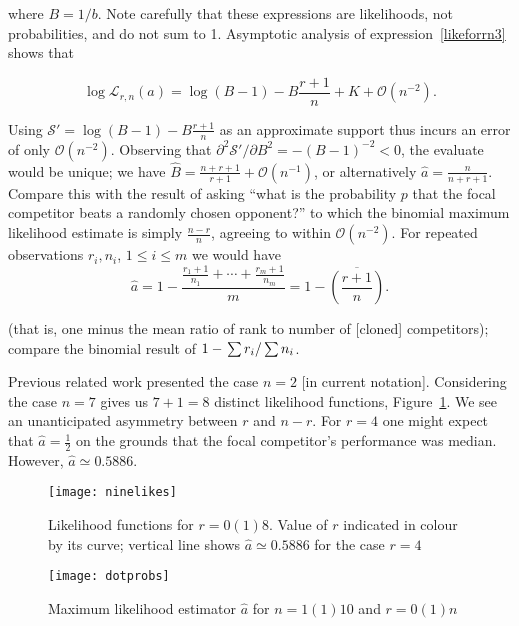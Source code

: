 \documentclass[ejs,noshowframe]{imsart}
\theoremstyle{plain}
\theoremstyle{definition}
\theoremstyle{remark}
\begin{document}
\noindent where $B=1/b$.  Note carefully that these expressions are
likelihoods, not probabilities, and do not sum to 1.  Asymptotic
analysis of expression~\ref{likeforrn3} shows that

\begin{equation}\label{asymptotic}
\log\mathcal{L}_{r,n}(a)=\log(B-1)-B\frac{r+1}{n}
+ K + \mathcal{O}\left(n^{-2}\right).
\end{equation}

Using $\mathcal{S}'=\log(B-1)-B\frac{r+1}{n}$ as an approximate support
thus incurs an error of only $\mathcal{O}(n^{-2})$.  Observing that
$\partial^2\mathcal{S'}/\partial B^2=-(B-1)^{-2}<0$, the evaluate
would be unique; we have
$\hat{B}=\frac{n+r+1}{r+1}+\mathcal{O}\left(n^{-1}\right)$, or
alternatively $\hat{a}=\frac{n}{n+r+1}$.  Compare this with the result
of asking ``what is the probability $p$ that the focal competitor
beats a randomly chosen opponent?'' to which the binomial maximum
likelihood estimate is simply $\frac{n-r}{n}$, agreeing to within
$\mathcal{O}(n^{-2})$.  For repeated observations $r_i,n_i$,
$1\leqslant i\leqslant m$ we would have
\begin{equation}
  \hat{a} = 1-
  \frac{\frac{r_1+1}{n_1}+\cdots+\frac{r_m+1}{n_m}}{m}
  = 1-\overline{\left(\frac{r+1}{n}\right)}.
\end{equation}

(that is, one minus the mean ratio of rank to number of [cloned]
competitors); compare the binomial result of $1-\left.\sum
r_i\right/\sum n_i$.

Previous related work presented the case $n=2$ [in current notation].
Considering the case $n=7$ gives us $7+1=8$ distinct likelihood
functions, Figure~\ref{ninelikes}.  We see an unanticipated asymmetry
between $r$ and $n-r$.  For $r=4$ one might expect that
$\hat{a}=\frac{1}{2}$ on the grounds that the focal competitor's
performance was median.  However, $\hat{a}\simeq 0.5886$.

\begin{figure}[t]
\texttt{[image: ninelikes]}  %
\caption{Likelihood functions for $r=0(1)8$\label{ninelikes}.  Value of $r$ indicated in colour by its curve; vertical line shows $\hat{a}\simeq 0.5886$ for the case $r=4$}
\end{figure}


\begin{figure}[t]
\texttt{[image: dotprobs]}  %
\caption{Maximum likelihood estimator $\hat{a}$ for $n=1(1)10$ and $r=0(1)n$
  \label{dotprobs}}
\end{figure}
\end{document}
